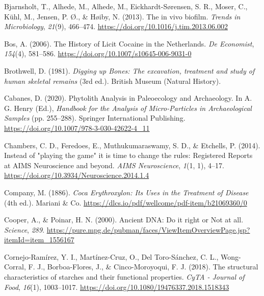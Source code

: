 \documentclass[
  letterpaper,
]{book}
\newlength{\cslhangindent}
\newlength{\cslentryspacingunit} %
\newenvironment{CSLReferences}[2] %
 {%
  \setlength{\parindent}{0pt}
  \ifodd #1
  \let\oldpar\par
  \def\par{\hangindent=\cslhangindent\oldpar}
  \fi
  \setlength{\parskip}{#2\cslentryspacingunit}
 }%
 {}
\begin{document}
\begin{CSLReferences}{1}{0}
\leavevmode{}%
Bjarnsholt, T., Alhede, M., Alhede, M., Eickhardt-Sørensen, S. R.,
Moser, C., Kühl, M., Jensen, P. Ø., \& Høiby, N. (2013). The in vivo
biofilm. \emph{Trends in Microbiology}, \emph{21}(9), 466--474.
\url{https://doi.org/10.1016/j.tim.2013.06.002}

\leavevmode{}%
Bos, A. (2006). The {History} of {Licit Cocaine} in the {Netherlands}.
\emph{De Economist}, \emph{154}(4), 581--586.
\url{https://doi.org/10.1007/s10645-006-9031-0}

\leavevmode{}%
Brothwell, D. (1981). \emph{Digging up {Bones}: {The} excavation,
treatment and study of human skeletal remains} (3rd ed.). {British
Museum (Natural History)}.

\leavevmode{}%
Cabanes, D. (2020). Phytolith {Analysis} in {Paleoecology} and
{Archaeology}. In A. G. Henry (Ed.), \emph{Handbook for the {Analysis}
of {Micro-Particles} in {Archaeological Samples}} (pp. 255--288).
{Springer International Publishing}.
\url{https://doi.org/10.1007/978-3-030-42622-4_11}

\leavevmode{}%
Chambers, C. D., Feredoes, E., Muthukumaraswamy, S. D., \& Etchells, P.
(2014). Instead of "playing the game" it is time to change the rules:
{Registered Reports} at {AIMS Neuroscience} and beyond. \emph{AIMS
Neuroscience}, \emph{1}(1, 1), 4--17.
\url{https://doi.org/10.3934/Neuroscience.2014.1.4}

\leavevmode{}%
Company, M. (1886). \emph{Coca {Erythroxylon}: {Its Uses} in the
{Treatment} of {Disease}} (4th ed.). {Mariani \& Co.}
\url{https://dlcs.io/pdf/wellcome/pdf-item/b21069360/0}

\leavevmode{}%
Cooper, A., \& Poinar, H. N. (2000). Ancient {DNA}: {Do} it right or
{Not} at all. \emph{Science}, \emph{289}.
\url{https://pure.mpg.de/pubman/faces/ViewItemOverviewPage.jsp?itemId=item_1556167}

\leavevmode{}%
Cornejo-Ramírez, Y. I., Martínez-Cruz, O., Del Toro-Sánchez, C. L.,
Wong-Corral, F. J., Borboa-Flores, J., \& Cinco-Moroyoqui, F. J. (2018).
The structural characteristics of starches and their functional
properties. \emph{CyTA - Journal of Food}, \emph{16}(1), 1003--1017.
\url{https://doi.org/10.1080/19476337.2018.1518343}


\end{CSLReferences}
\end{document}
